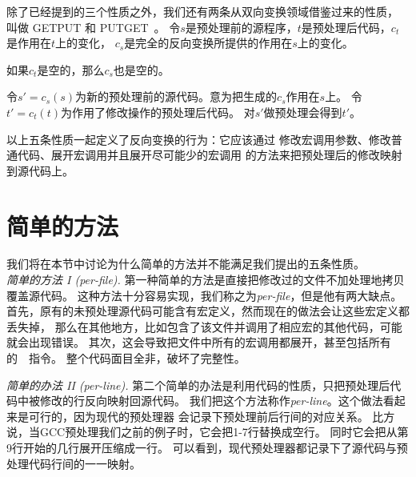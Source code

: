 除了已经提到的三个性质之外，我们还有两条从双向变换领域借鉴过来的性质，
叫做 GETPUT 和 PUTGET~\parencite{Foster:2007}。
令$s$是预处理前的源程序，$t$是预处理后代码，$c_t$是作用在$t$上的变化，
$c_s$是完全的反向变换所提供的作用在$s$上的变化。

\begin{decision}[GETPUT]
  如果$c_t$是空的，那么$c_s$也是空的。
\end{decision}

\begin{decision}[PUTGET]
  令$s'=c_s(s)$为新的预处理前的源代码。意为把生成的$c_s$作用在$s$上。
  令$t'=c_t(t)$为作用了修改操作的预处理后代码。
  对$s'$做预处理会得到$t'$。
\end{decision}


以上五条性质一起定义了反向变换的行为：它应该通过
修改宏调用参数、修改普通代码、展开宏调用并且展开尽可能少的宏调用
的方法来把预处理后的修改映射到源代码上。 

\section{简单的方法}\label{sec:naive}
我们将在本节中讨论为什么简单的方法并不能满足我们提出的五条性质。\\

\noindent\emph{简单的方法 I (per-file).}
第一种简单的方法是直接把修改过的文件不加处理地拷贝覆盖源代码。
这种方法十分容易实现，我们称之为\emph{per-file}，但是他有两大缺点。
首先，原有的未预处理源代码可能含有宏定义，然而现在的做法会让这些宏定义都丢失掉，
那么在其他地方，比如包含了该文件并调用了相应宏的其他代码，可能就会出现错误。
其次，这会导致把文件中所有的宏调用都展开，甚至包括所有的~~指令。
整个代码面目全非，破坏了完整性。

\noindent\emph{简单的办法 II (per-line).}
第二个简单的办法是利用代码的性质，只把预处理后代码中被修改的行反向映射回源代码。
我们把这个方法称作\emph{per-line}。这个做法看起来是可行的，因为现代的预处理器
会记录下预处理前后行间的对应关系。
比方说，当GCC预处理我们之前的例子时，它会把1-7行替换成空行。
同时它会把从第9行开始的几行展开压缩成一行。
可以看到，现代预处理器都记录下了源代码与预处理代码行间的一一映射。

